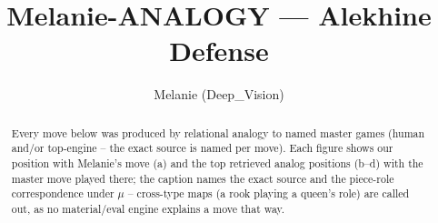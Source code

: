 \documentclass[11pt]{article}
\title{Melanie-ANALOGY — Alekhine Defense}
\author{Melanie (Deep\_Vision)}
\date{}
\begin{document}
\maketitle

\begin{abstract}Every move below was produced by relational analogy to named master games (human and/or top-engine -- the exact source is named per move). Each figure shows our position with Melanie's move (a) and the top retrieved analog positions (b--d) with the master move played there; the caption names the exact source and the piece-role correspondence under $\mu$ -- cross-type maps (a rook playing a queen's role) are called out, as no material/eval engine explains a move that way.\end{abstract}

\begin{figure}[p]\centering
\begin{subfigure}{0.46\textwidth}\centering
\resizebox{\linewidth}{!}{%
\newchessgame
\chessboard[
  setfen={rnbqk2r/ppp1ppbp/1n1p2p1/4P3/3P3P/1B3N2/PPP2PP1/RNBQK2R b KQkq - 0 7},
  showmover=false,
  pgfstyle=straightmove, color=movearrow, markmove={d6-e5}
]}
\caption{}
\end{subfigure}\hfill
\begin{subfigure}{0.46\textwidth}\centering
\resizebox{\linewidth}{!}{%
\newchessgame
\chessboard[
  setfen={rnbqk1nr/pp2ppbp/3p2p1/2p5/2BPP3/2P2N2/PP3PPP/RNBQK2R b KQkq - 0 5},
  showmover=false,
  pgfstyle=straightmove, color=movearrow, markmove={c5-d4}
]}
\caption{}
\end{subfigure}
\\[4pt]
\begin{subfigure}{0.46\textwidth}\centering
\resizebox{\linewidth}{!}{%
\newchessgame
\chessboard[
  setfen={rnbqk1nr/pp2ppbp/3p2p1/2p5/2BPP3/2P2N2/PP3PPP/RNBQK2R b KQkq - 0 5},
  showmover=false,
  pgfstyle=straightmove, color=movearrow, markmove={c5-d4}
]}
\caption{}
\end{subfigure}\hfill
\begin{subfigure}{0.46\textwidth}\centering
\resizebox{\linewidth}{!}{%
\newchessgame
\chessboard[
  setfen={rnbqk1nr/pp2ppbp/3p2p1/2p5/2BPP3/2P2N2/PP3PPP/RNBQK2R b KQkq - 0 5},
  showmover=false,
  pgfstyle=straightmove, color=movearrow, markmove={c5-d4}
]}
\caption{}
\end{subfigure}

\end{figure}
\end{document}
